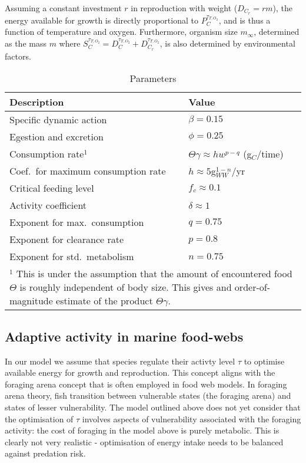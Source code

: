 \documentclass{article}\usepackage[]{graphicx}\usepackage[]{color}
\begin{document}
Assuming a constant investment $r$ in reproduction with weight ($D_{C_r}=rm$), the energy available for growth is directly proportional to $P_C^{\tau_{T,O_2}}$, and is thus a function of temperature and oxygen. Furthermore, organism size $m_{\infty}$, determined as the mass $m$ where $S_C^{\tau_{T,O_2}} = D_C^{\tau_{T,O_2}} + D_{C_r}^{\tau_{T,O_2}}$, is also determined by environmental factors.


\begin{table}
\caption{Parameters}
\begin{tabular}{ll}
Description & Value \\
\hline
Specific dynamic action & $\beta = 0.15$ \\
Egestion and excretion & $\phi = 0.25$ \\
Consumption rate$^1$ & $\Theta \gamma \approx h w^{p-q}$ (g$_C$/time) \\
Coef.~for maximum consumption rate & $h \approx 5 $g$_{WW}^{1-n}$/yr \\
Critical feeding level & $f_c \approx 0.1 $\\
Activity coefficient & $\delta \approx 1$ \\
Exponent for max.~consumption & $q=0.75$ \\
Exponent for clearance rate & $p=0.8$ \\
Exponent for std.~metabolism & $n=0.75$ \\
\hline
\multicolumn{2}{p{\textwidth}}{$^1$ This is under the assumption that the amount of encountered food $\Theta$ is roughly independent of body size.  This gives and order-of-magnitude estimate of the product $\Theta \gamma $.}
\end{tabular}
\end{table}

\subsection{Adaptive activity in marine food-webs}

In our model we assume that species regulate their activty level $\tau$ to optimise available energy for growth and reproduction. This concept aligns with the foraging arena concept that is often employed in food web models. In foraging arena theory, fish transition between vulnerable states (the foraging arena) and states of lesser vulnerability. The model outlined above does not yet consider that the optimisation of $\tau$ involves aspects of vulnerability associated with the foraging activity: the cost of foraging in the model above is purely metabolic. This is clearly not very realistic - optimisation of energy intake needs to be balanced against predation risk.
\end{document}
